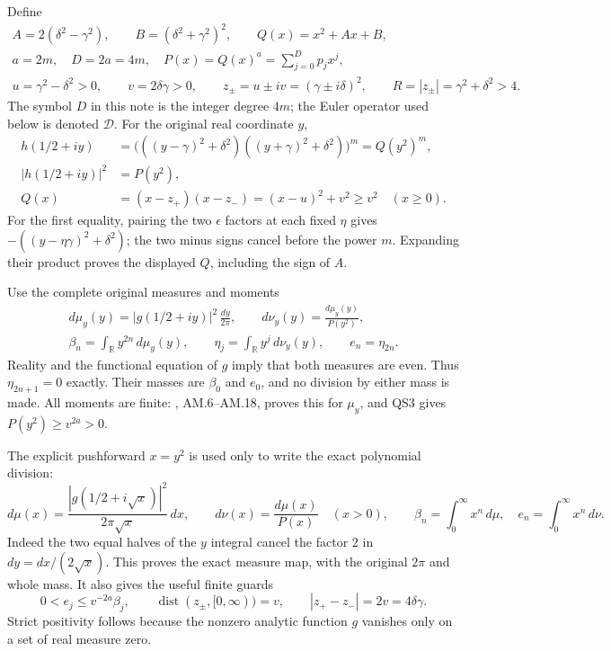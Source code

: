 \documentclass[11pt]{article}
\newcommand{\R}{\mathbb R}
\begin{document}
Define
\begin{equation}\tag{QS2}
\begin{gathered}
 A=2(\delta^2-\gamma^2),\qquad
 B=(\delta^2+\gamma^2)^2,\qquad
 Q(x)=x^2+Ax+B,\\
 a=2m,\quad D=2a=4m,\quad P(x)=Q(x)^a=\sum_{j=0}^D p_jx^j,\\
 u=\gamma^2-\delta^2>0,\qquad v=2\delta\gamma>0,\qquad
 z_\pm=u\pm iv=(\gamma\pm i\delta)^2,\qquad
 R=|z_\pm|=\gamma^2+\delta^2>4.
\end{gathered}
\end{equation}
The symbol \(D\) in this note is the integer degree \(4m\);
the Euler operator used below is denoted \(\mathcal D\).
For the original real coordinate \(y\),
\begin{equation}\tag{QS3}
\begin{aligned}
 h(1/2+iy)
 &=\bigl(((y-\gamma)^2+\delta^2)
          ((y+\gamma)^2+\delta^2)\bigr)^m=Q(y^2)^m,\\
 |h(1/2+iy)|^2&=P(y^2),\\
 Q(x)&=(x-z_+)(x-z_-)=(x-u)^2+v^2\ge v^2
                      \quad(x\ge0).
\end{aligned}
\end{equation}
For the first equality, pairing the two \(\epsilon\) factors
at each fixed \(\eta\) gives
\(-((y-\eta\gamma)^2+\delta^2)\); the two minus signs
cancel before the power \(m\). Expanding their product proves
the displayed \(Q\), including the sign of \(A\).

Use the complete original measures and moments
\begin{equation}\tag{QS4}
\begin{gathered}
 d\mu_y(y)=|g(1/2+iy)|^2\,\frac{dy}{2\pi},\qquad
 d\nu_y(y)=\frac{d\mu_y(y)}{P(y^2)},\\
 \beta_n=\int_{\R}y^{2n}\,d\mu_y(y),\qquad
 \eta_j=\int_{\R}y^j\,d\nu_y(y),\qquad e_n=\eta_{2n}.
\end{gathered}
\end{equation}
Reality and the functional equation of \(g\) imply that both
measures are even. Thus \(\eta_{2n+1}=0\) exactly.
Their masses are \(\beta_0\) and \(e_0\), and no division by
either mass is made.
All moments are finite: \cite{AM}, AM.6--AM.18, proves this
for \(\mu_y\), and QS3 gives \(P(y^2)\ge v^{2a}>0\).

The explicit pushforward \(x=y^2\) is used only to write
the exact polynomial division:
\begin{equation}\tag{QS5}
 d\mu(x)=\frac{|g(1/2+i\sqrt x)|^2}{2\pi\sqrt x}\,dx,\qquad
 d\nu(x)=\frac{d\mu(x)}{P(x)}\quad(x>0),\qquad
 \beta_n=\int_0^\infty x^n\,d\mu,\quad e_n=\int_0^\infty x^n\,d\nu .
\end{equation}
Indeed the two equal halves of the \(y\) integral cancel the
factor \(2\) in \(dy=dx/(2\sqrt x)\).
This proves the exact measure map, with the original \(2\pi\)
and whole mass. It also gives the useful finite guards
\begin{equation}\tag{QS6}
 0<e_j\le v^{-2a}\beta_j,\qquad
 \operatorname{dist}(z_\pm,[0,\infty))=v,\qquad
 |z_+-z_-|=2v=4\delta\gamma .
\end{equation}
Strict positivity follows because the nonzero analytic function
\(g\) vanishes only on a set of real measure zero.
\end{document}

